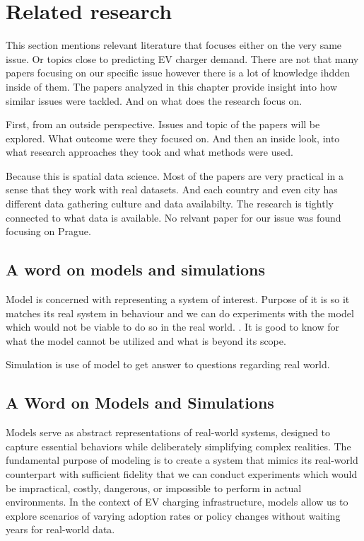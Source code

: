 \setchapterpreamble[u]{\margintoc}
\chapter{Related research}

This section mentions relevant literature that focuses either on the very same issue. Or topics close to predicting EV charger demand. There are not that many papers focusing on our specific issue however there is a lot of knowledge ihdden inside of them. The papers analyzed in this chapter provide insight into how similar issues were tackled. And on what does the research focus on.


First, from an outside perspective. Issues and topic of the papers will be explored. What outcome were they focused on. And then an inside look, into what research approaches they took and what methods were used.

Because this is spatial data science. Most of the papers are very practical in a sense that they work with real datasets. And each country and even city has different data gathering culture and data availabilty. The research is tightly connected to what data is available. No relvant paper for our issue was found focusing on Prague.

\section{A word on models and simulations}

Model is concerned with representing a system of interest. Purpose of it is so it matches its real system in behaviour and we can do experiments with the model which would not be viable to do so in the real world. . It is good to know for what the model cannot be utilized and what is beyond its scope.

Simulation is use of model to get answer to questions regarding real world.

\section{A Word on Models and Simulations}

Models serve as abstract representations of real-world systems, designed to capture essential behaviors while deliberately simplifying complex realities. The fundamental purpose of modeling is to create a system that mimics its real-world counterpart with sufficient fidelity that we can conduct experiments which would be impractical, costly, dangerous, or impossible to perform in actual environments. In the context of EV charging infrastructure, models allow us to explore scenarios of varying adoption rates or policy changes without waiting years for real-world data.

